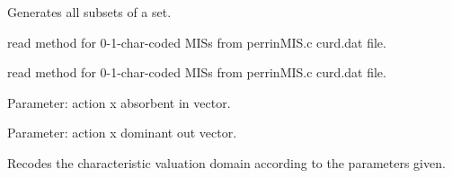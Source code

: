 \documentclass[letterpaper,10pt,english]{sphinxmanual}
\begin{document}
\begin{fulllineitems}
\begin{fulllineitems}
\end{fulllineitems}


\begin{fulllineitems}
\label{techDoc:digraphs.Digraph.powerset}
Generates all subsets of a set.

\end{fulllineitems}


\begin{fulllineitems}
\label{techDoc:digraphs.Digraph.readPerrinMisset}
read method for 0-1-char-coded MISs from perrinMIS.c curd.dat file.

\end{fulllineitems}


\begin{fulllineitems}
\label{techDoc:digraphs.Digraph.readPerrinMissetOpt}
read method for 0-1-char-coded MISs from perrinMIS.c curd.dat file.

\end{fulllineitems}


\begin{fulllineitems}
\label{techDoc:digraphs.Digraph.readabsvector}
Parameter: action x
absorbent in vector.

\end{fulllineitems}


\begin{fulllineitems}
\label{techDoc:digraphs.Digraph.readdomvector}
Parameter: action x
dominant out vector.

\end{fulllineitems}


\begin{fulllineitems}
\label{techDoc:digraphs.Digraph.recodeValuation}
Recodes the characteristic valuation domain according
to the parameters given.


\end{fulllineitems}
\end{fulllineitems}
\end{document}
